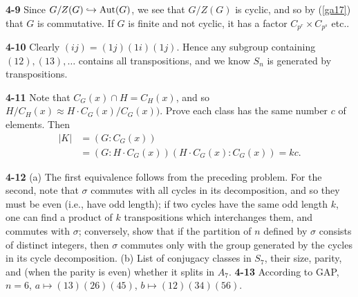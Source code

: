 \documentclass[a4paper,11pt,final]{memoir}%
\theoremstyle{nonumberplain}
\begin{document}
\bigskip\noindent\textbf{4-9}
Since $G/Z(G)\hookrightarrow\operatorname{Aut}(G)$, we see that $G/Z(G)$ is cyclic, and so
by (\ref{ga17}) that $G$ is commutative. If $G$ is finite and not cyclic, it
has a factor $C_{p^{r}}\times C_{p^{s}}$ etc..

\bigskip\noindent\textbf{4-10}
Clearly $(ij)=(1j)(1i)(1j)$. Hence any subgroup containing $(12),(13),\ldots$
contains all transpositions, and we know $S_{n}$ is generated by transpositions.

\bigskip\noindent\textbf{4-11}
Note that $C_{G}(x)\cap H=C_{H}(x)$, and so $H/C_{H}(x)\approx H\cdot
C_{G}(x)/C_{G}(x))$. Prove each class has the same number $c$ of elements.
Then
\begin{align*}
|K|&=(G:C_{G}(x))\\
&=(G:H\cdot C_{G}(x))(H\cdot C_{G}(x):C_{G}(x))=kc.
\end{align*}

\bigskip\noindent\textbf{4-12}
(a) The first equivalence follows from the preceding problem. For the second,
note that $\sigma$ commutes with all cycles in its decomposition, and so they
must be even (i.e., have odd length); if two cycles have the same odd length
$k$, one can find a product of $k$ transpositions which interchanges them, and
commutes with $\sigma$; conversely, show that if the partition of $n$ defined
by $\sigma$ consists of distinct integers, then $\sigma$ commutes only with
the group generated by the cycles in its cycle decomposition. (b) List of
conjugacy classes in $S_{7}$, their size, parity, and (when the parity is
even) whether it splits in $A_{7}$.
\bigskip\noindent\textbf{4-13}
According to GAP, $n=6$, $a\mapsto(13)(26)(45)$, $b\mapsto(12)(34)(56)$.
\end{document}
